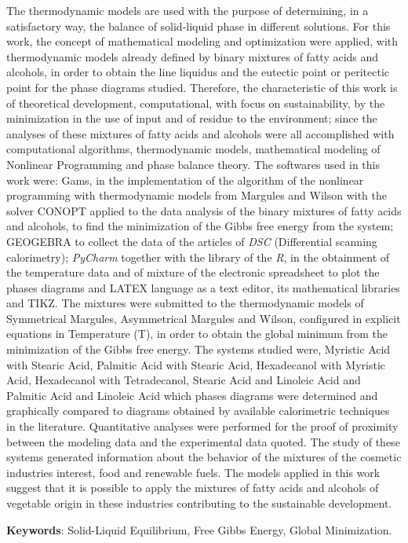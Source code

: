 
\begin{resumo}[ABSTRACT]
\begin{SingleSpacing}


The thermodynamic models are used with the purpose of determining, in a satisfactory way, the balance of solid-liquid phase in different solutions. For this work, the concept of mathematical modeling and optimization were applied, with thermodynamic models already defined by binary mixtures of fatty acids and alcohols, in order to obtain the line liquidus and the eutectic point or peritectic point for the phase diagrams studied. Therefore, the characteristic of this work is of theoretical development, computational, with focus on sustainability, by the minimization in the use of input and of residue to the environment; since the analyses of these mixtures of fatty acids and alcohols were all accomplished with computational algorithms, thermodynamic models, mathematical modeling of Nonlinear Programming and phase balance theory. The softwares used in this work were: Gams, in the implementation of the algorithm of the nonlinear programming with thermodynamic models from Margules and Wilson with the solver CONOPT applied to the data analysis of the binary mixtures of fatty acids and alcohols, to find the minimization of the Gibbs free energy from the system; GEOGEBRA to collect the data of the articles of \textit{DSC} (Differential scanning calorimetry); \textit{PyCharm} together with the library of the \textit{R},  in the obtainment of the temperature data and of mixture of the electronic spreadsheet to plot the phases diagrams  and LATEX language as a text editor, its mathematical libraries and TIKZ. The mixtures were submitted to the thermodynamic models of Symmetrical Margules, Asymmetrical Margules and Wilson, configured in explicit equations in Temperature (T), in order to obtain the global minimum from the minimization of the Gibbs free energy. The systems studied were, Myristic Acid with Stearic Acid, Palmitic Acid with Stearic Acid, Hexadecanol with Myristic Acid, Hexadecanol with Tetradecanol, Stearic Acid and Linoleic Acid and Palmitic Acid and Linoleic Acid which phases diagrams were determined and graphically compared to diagrams obtained by available calorimetric techniques in the literature. Quantitative analyses were performed for the proof of proximity between the modeling data and the experimental data quoted. The study of these systems generated information about the behavior of the mixtures of the cosmetic industries interest, food and renewable fuels. The models applied in this work suggest that it is possible to apply the mixtures of fatty acids and alcohols of vegetable origin in these industries contributing to the sustainable development.
\vspace{1cm}
		
\textbf{Keywords}: Solid-Liquid Equilibrium, Free Gibbs Energy, Global Minimization.

\end{SingleSpacing}
\end{resumo}

